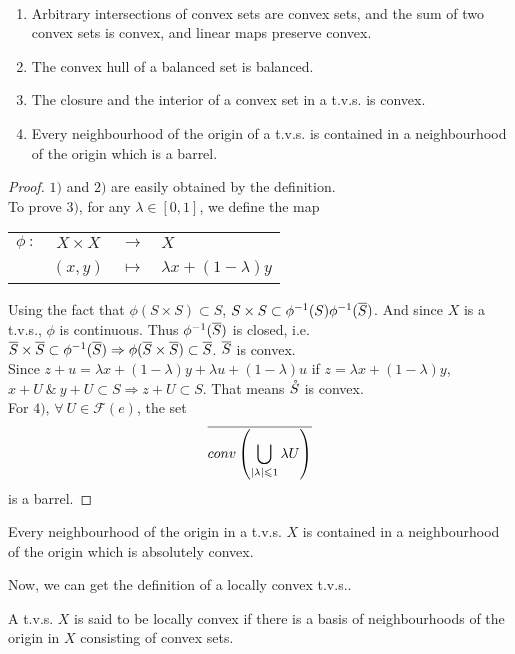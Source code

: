 \documentclass[a4paper,11pt]{report}
\begin{document}
\begin{prop}
	~
	\begin{enumerate}[label=\arabic*)]
		\item Arbitrary intersections of convex sets are convex sets, and the sum of two convex sets is convex, and linear maps preserve convex.
		\item The convex hull of a balanced set is balanced.
		\item The closure and the interior of a convex set in a t.v.s. is convex.
		\item Every neighbourhood of the origin of a t.v.s. is contained in a neighbourhood of the origin which is a barrel.
	\end{enumerate}
\end{prop}
\begin{proof}
	$1)$ and $2)$ are easily obtained by the definition. \\
	To prove $3)$, for any $\lambda \in [0,1]$, we define the map
	\begin{center}
		\begin{tabular}{l c c l}
			$\phi ~ \colon$ & $X \times X$ & $\longrightarrow$ & $X$ \\
			~ & $(x,y)$ & $\mapsto$ & $\lambda x + (1-\lambda) y$
		\end{tabular}
	\end{center}
	Using the fact that $\phi(S \times S) \subset S$, $S \times S \subset \phi^{-1}(S) \phi^{-1}(\overline{S})$. And since $X$ is a t.v.s., $\phi$ is continuous. Thus $\phi^{-1}(\overline{S})$ is closed, i.e. $\overline{S} \times \overline{S} \subset \phi^{-1}(\overline{S}) \Rightarrow \phi(\overline{S} \times \overline{S}) \subset \overline{S}$. $\overline{S}$ is convex.\\
	Since $z+u = \lambda x + (1-\lambda) y + \lambda u + (1-\lambda) u$ if $z = \lambda x + (1-\lambda) y$, $x + U ~\&~ y + U \subset S \Rightarrow z + U \subset S$. That means $\mathring{S}$ is convex.\\
	For $4)$, $\forall ~ U \in \mathscr{F}(e)$, the set
	\begin{equation*}
		\overline{conv\left(\bigcup_{\left\lvert\lambda\right\lvert \leqslant 1}\lambda U\right)}
	\end{equation*}
	is a barrel.
\end{proof}
\begin{cor}
	Every neighbourhood of the origin in a t.v.s. $X$ is contained in a neighbourhood of the origin which is absolutely convex.
\end{cor}

Now, we can get the definition of a locally convex t.v.s..
\begin{defn}
	A t.v.s. $X$ is said to be locally convex if there is a basis of neighbourhoods of the origin in $X$ consisting of convex sets.
\end{defn}
\end{document}
